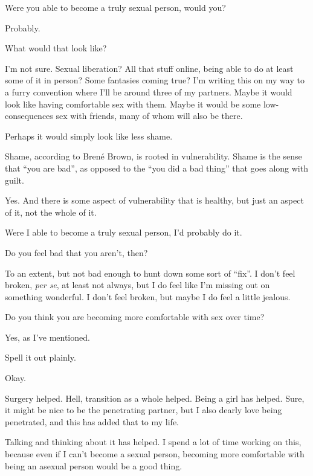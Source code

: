 \begin{paracol}{2}
\begin{leftcolumn}
\begin{ally}
Were you able to become a truly sexual person, would you?
\end{ally}
Probably.

\begin{ally}
What would that look like?
\end{ally}
I'm not sure. Sexual liberation? All that stuff online, being able to do at least some of it in person? Some fantasies coming true? I'm writing this on my way to a furry convention where I'll be around three of my partners. Maybe it would look like having comfortable sex with them. Maybe it would be some low-consequences sex with friends, many of whom will also be there.

Perhaps it would simply look like less shame.

\begin{ally}
Shame, according to Brené Brown, is rooted in vulnerability. Shame is the sense that ``you are bad'', as opposed to the ``you did a bad thing'' that goes along with guilt.
\end{ally}
Yes. And there is some aspect of vulnerability that is healthy, but just an aspect of it, not the whole of it.

Were I able to become a truly sexual person, I'd probably do it.

\begin{ally}
Do you feel bad that you aren't, then?
\end{ally}
To an extent, but not bad enough to hunt down some sort of ``fix''. I don't feel broken, \emph{per se}, at least not always, but I do feel like I'm missing out on something wonderful. I don't feel broken, but maybe I do feel a little jealous.
\newpage

\begin{ally}
Do you think you are becoming more comfortable with sex over time?
\end{ally}
Yes, as I've mentioned.

\begin{ally}
Spell it out plainly.
\end{ally}
Okay.

Surgery helped. Hell, transition as a whole helped. Being a girl has helped. Sure, it might be nice to be the penetrating partner, but I also dearly love being penetrated, and this has added that to my life.

Talking and thinking about it has helped. I spend a lot of time working on this, because even if I can't become a sexual person, becoming more comfortable with being an asexual person would be a good thing.


\end{leftcolumn}
\end{paracol}
